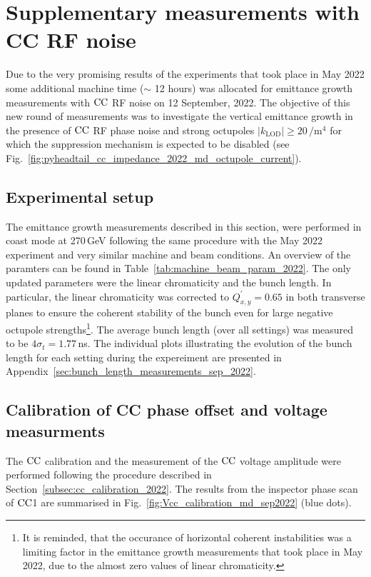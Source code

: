 

\section{Supplementary measurements with CC RF noise}\label{sec:cc_md_Sep2022}
Due to the very promising results of the experiments that took place in May 2022 some additional machine time ($\sim$ 12 hours) was allocated for emittance growth measurements with ${\mathrm{CC}}$ RF noise on 12 September, 2022. The objective of this new round of measurements was to investigate the vertical emittance growth in the presence of ${\mathrm{CC}}$ RF phase noise and strong octupoles $|k_\mathrm{LOD} | \geq 20$\,$\mathrm{/m^4}$ for which the suppression mechanism is expected to be disabled (see Fig.~\ref{fig:pyheadtail_cc_impedance_2022_md_octupole_current}).

\subsection{Experimental setup}
The emittance growth measurements described in this section, were performed in coast mode at 270\,GeV following the same procedure with the May 2022 experiment and very similar machine and beam conditions. An overview of the paramters can be found in Table~\ref{tab:machine_beam_param_2022}. The only updated parameters were the linear chromaticity and the bunch length. In particular, the linear chromaticity was corrected to $Q^\prime_{x,y}=0.65$ in both transverse planes to ensure the coherent stability of the bunch even for large negative octupole strengths\footnote{It is reminded, that the occurance of horizontal coherent instabilities was a limiting factor in the emittance growth measurements that took place in May 2022, due to the almost zero values of linear chromaticity.}. The average bunch length (over all settings) was measured to be $4\sigma_t=1.77$\,ns. The individual plots illustrating the evolution of the bunch length for each setting during the expereiment are presented in Appendix~\ref{sec:bunch_length_measurements_sep_2022}.


\subsection{Calibration of CC phase offset and voltage measurments}
The ${\mathrm{CC}}$ calibration and the measurement of the ${\mathrm{CC}}$ voltage amplitude were performed following the procedure described in Section~\ref{subsec:cc_calibration_2022}. The results from the inspector phase scan of ${\mathrm{CC}}$1 are summarised in Fig.~\ref{fig:Vcc_calibration_md_sep2022} (blue dots).

